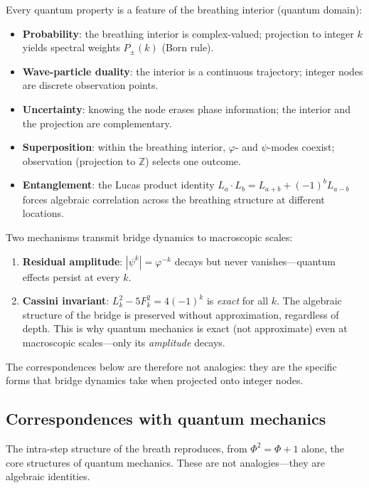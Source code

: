 \documentclass[12pt,a4paper]{article}
\begin{document}
\noindent Every quantum property is a feature of the breathing interior (quantum domain):

\begin{itemize}[nosep]
\item \textbf{Probability}: the breathing interior is complex-valued; projection to integer $k$ yields spectral weights $P_\pm(k)$ (Born rule).
\item \textbf{Wave-particle duality}: the interior is a continuous trajectory; integer nodes are discrete observation points.
\item \textbf{Uncertainty}: knowing the node erases phase information; the interior and the projection are complementary.
\item \textbf{Superposition}: within the breathing interior, $\varphi$- and $\psi$-modes coexist; observation (projection to $\mathbb{Z}$) selects one outcome.
\item \textbf{Entanglement}: the Lucas product identity $L_a \cdot L_b = L_{a+b} + (-1)^b L_{a-b}$ forces algebraic correlation across the breathing structure at different locations.
\end{itemize}

\noindent Two mechanisms transmit bridge dynamics to macroscopic scales:
\begin{enumerate}[nosep]
\item \textbf{Residual amplitude}: $|\psi^k| = \varphi^{-k}$ decays but never vanishes---quantum effects persist at every $k$.
\item \textbf{Cassini invariant}: $L_k^2 - 5F_k^2 = 4(-1)^k$ is \emph{exact} for all $k$. The algebraic structure of the bridge is preserved without approximation, regardless of depth. This is why quantum mechanics is exact (not approximate) even at macroscopic scales---only its \emph{amplitude} decays.
\end{enumerate}

\noindent The correspondences below are therefore not analogies: they are the specific forms that bridge dynamics take when projected onto integer nodes.

\subsection{Correspondences with quantum mechanics}
\label{sec:qm-correspondences}
\label{sec:berry-phase}

The intra-step structure of the breath reproduces, from $\Phi^2 = \Phi + 1$ alone, the core structures of quantum mechanics.  These are not analogies---they are algebraic identities.
\end{document}
